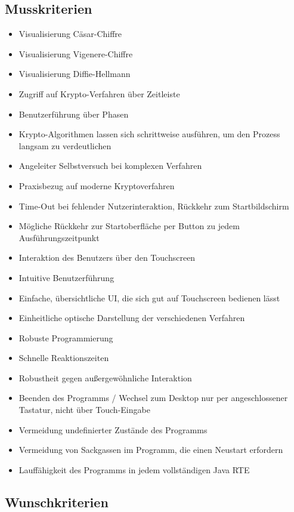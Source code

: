 \documentclass{article}
\begin{document}
\subsection{Musskriterien}

\begin{itemize}
    \item Visualisierung Cäsar-Chiffre
    \item Visualisierung Vigenere-Chiffre
    \item Visualisierung Diffie-Hellmann
    \item Zugriff auf Krypto-Verfahren über Zeitleiste
    \item Benutzerführung über Phasen
    \item Krypto-Algorithmen lassen sich schrittweise ausführen, um den Prozess
        langsam zu verdeutlichen
    \item Angeleiter Selbstversuch bei komplexen Verfahren
    \item Praxisbezug auf moderne Kryptoverfahren
    \item Time-Out bei fehlender Nutzerinteraktion, Rückkehr zum Startbildschirm
    \item Mögliche Rückkehr zur Startoberfläche per Button zu jedem Ausführungszeitpunkt
    \item Interaktion des Benutzers über den Touchscreen
    \item Intuitive Benutzerführung
    \item Einfache, übersichtliche \gls{UI}, die sich gut auf Touchscreen bedienen lässt
    \item Einheitliche optische Darstellung der verschiedenen Verfahren
    \item Robuste Programmierung
    \item Schnelle Reaktionszeiten
    \item Robustheit gegen außergewöhnliche Interaktion
    \item Beenden des Programms / Wechsel zum Desktop nur per angeschlossener Tastatur, nicht über Touch-Eingabe
    \item Vermeidung undefinierter Zustände des Programms
    \item Vermeidung von Sackgassen im Programm, die einen Neustart erfordern
    \item Lauffähigkeit des Programms in jedem vollständigen Java RTE
\end{itemize}

\subsection{Wunschkriterien}
\end{document}
